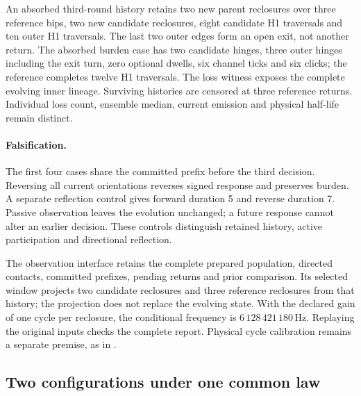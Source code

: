 An absorbed third-round history retains two new parent reclosures over three
reference bips, two new candidate reclosures, eight candidate H1 traversals and
ten outer H1 traversals. The last two outer edges form an open exit, not another
return. The absorbed burden case has two candidate hinges, three outer hinges
including the exit turn, zero optional dwells, six channel ticks and six clicks;
the reference completes twelve H1 traversals. The loss witness exposes the
complete evolving inner lineage. Surviving
histories are censored at three reference returns. Individual loss count,
ensemble median, current emission and physical half-life remain distinct.

\paragraph{Falsification.}
The first four cases share the committed prefix before the third decision.
Reversing all current orientations reverses signed response and preserves
burden. A separate reflection control gives forward duration 5 and reverse
duration 7. Passive observation leaves the evolution unchanged; a future response
cannot alter an earlier decision. These controls distinguish retained history,
active participation and directional reflection.

The observation interface retains the complete prepared population, directed
contacts, committed prefixes, pending returns and prior comparison. Its selected
window projects two candidate reclosures and three reference reclosures from
that history; the projection does not replace the evolving state. With the
declared gain of one cycle per reclosure, the conditional frequency is
\(6\,128\,421\,180\,\mathrm{Hz}\). Replaying the original inputs checks the
complete report. Physical cycle calibration remains a separate premise, as in
.


\subsection{Two configurations under one common law}
\label{manual2:paired-configurations}
